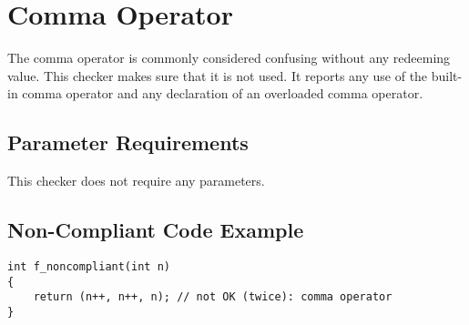 %
%

\section{Comma Operator}
\label{CommaOperator::overview}

The comma operator is commonly considered confusing without any redeeming
value. This checker makes sure that it is not used. It reports any use of the
built-in comma operator and any declaration of an overloaded comma operator.

\subsection{Parameter Requirements}

This checker does not require any parameters.

\subsection{Non-Compliant Code Example}

\begin{verbatim}
int f_noncompliant(int n)
{
    return (n++, n++, n); // not OK (twice): comma operator
}
\end{verbatim}

